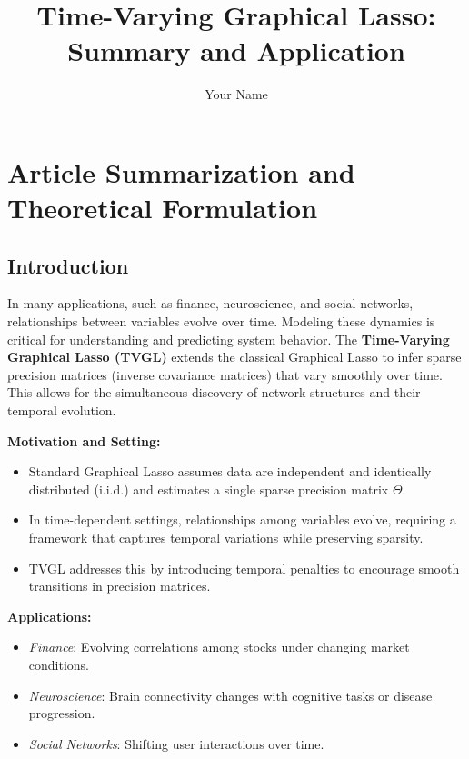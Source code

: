\documentclass{article}
\title{Time-Varying Graphical Lasso: Summary and Application}
\author{Your Name}
\date{}
\begin{document}
\maketitle

\tableofcontents

\section{Article Summarization and Theoretical Formulation}
\label{sec:summary_theory}

\subsection{Introduction}
\label{subsec:intro}

In many applications, such as finance, neuroscience, and social networks, relationships between variables evolve over time. Modeling these dynamics is critical for understanding and predicting system behavior. The \textbf{Time-Varying Graphical Lasso (TVGL)} extends the classical Graphical Lasso to infer sparse precision matrices (inverse covariance matrices) that vary smoothly over time. This allows for the simultaneous discovery of network structures and their temporal evolution.

\vspace{0.5em}
\noindent\textbf{Motivation and Setting:}
\begin{itemize}
    \item Standard Graphical Lasso assumes data are independent and identically distributed (i.i.d.) and estimates a single sparse precision matrix $\Theta$.
    \item In time-dependent settings, relationships among variables evolve, requiring a framework that captures temporal variations while preserving sparsity.
    \item TVGL addresses this by introducing temporal penalties to encourage smooth transitions in precision matrices.
\end{itemize}

\vspace{0.5em}
\noindent\textbf{Applications:}
\begin{itemize}
    \item \textit{Finance}: Evolving correlations among stocks under changing market conditions.
    \item \textit{Neuroscience}: Brain connectivity changes with cognitive tasks or disease progression.
    \item \textit{Social Networks}: Shifting user interactions over time.
\end{itemize}
\end{document}
